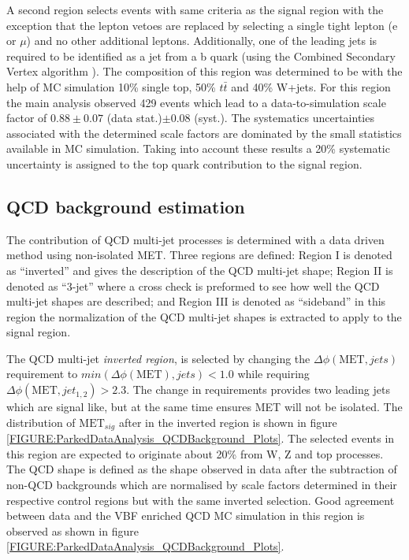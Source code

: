 A second region selects events with same criteria as the signal region with the exception that the lepton vetoes are replaced by selecting a single tight lepton (e or $\mu$) and no other additional leptons. Additionally, one of the leading jets is required to be identified as a jet from a b quark (using the Combined Secondary Vertex algorithm \cite{ARTICLE:CMSIdentificationOfbQuarks}). The composition of this region was determined to be with the help of \gls{MC} simulation 10\% single top, 50\% $t\bar{t}$ and 40\% W+jets. For this region the main analysis observed 429 events which lead to a data-to-simulation scale factor of $0.88\pm 0.07$ (data stat.)$ \pm 0.08$ (syst.). The systematics uncertainties associated with the determined scale factors are dominated by the small statistics available in \gls{MC} simulation. Taking into account these results a 20\% systematic uncertainty is assigned to the top quark contribution to the signal region. 

\subsection{QCD background estimation}
\label{SECTION:ParkedDataAnalysis_ControlRegions_QCDBackground}


The contribution of \gls{QCD} multi-jet processes is determined with a data driven method using non-isolated \gls{MET}. Three regions are defined: Region I is denoted as ``inverted'' and gives the description of the \gls{QCD} multi-jet shape; Region II is denoted as ``3-jet'' where a cross check is preformed to see how well the \gls{QCD} multi-jet shapes are described; and Region III is denoted as ``sideband'' in this region the normalization of the \gls{QCD} multi-jet shapes is extracted to apply to the signal region.

The \gls{QCD} multi-jet \textit{inverted region}, is selected by changing the $\Delta\phi(\text{MET},jets)$ requirement to $min(\Delta\phi(\text{MET}),jets)<1.0$ while requiring $\Delta\phi(\text{MET},jet_{1,2})>2.3$. The change in requirements provides two leading jets which are signal like, but at the same time ensures \gls{MET} will not be isolated. The distribution of $\text{MET}_{sig}$ after in the inverted region is shown in figure \ref{FIGURE:ParkedDataAnalysis_QCDBackground_Plots}. The selected events in this region are expected to originate about 20\% from W, Z and top processes. The \gls{QCD} shape is defined as the shape observed in data after the subtraction of non-\gls{QCD} backgrounds which are normalised by scale factors determined in their respective control regions but with the same inverted selection. Good agreement between data and the \gls{VBF} enriched \gls{QCD} \gls{MC} simulation in this region is observed as shown in figure \ref{FIGURE:ParkedDataAnalysis_QCDBackground_Plots}.

